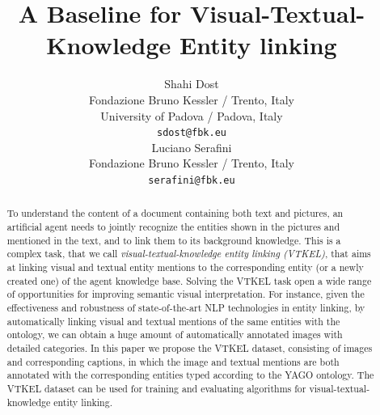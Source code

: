 \documentclass[11pt,a4paper]{article}
\title{A Baseline for Visual-Textual-Knowledge Entity linking}
\author{Shahi Dost \\
  Fondazione Bruno Kessler / Trento, Italy \\
  University of Padova / Padova, Italy \\
  {\tt sdost@fbk.eu} \\\And
  Luciano Serafini \\
  Fondazione Bruno Kessler / Trento, Italy \\
  {\tt serafini@fbk.eu} \\}
\date{}
\begin{document}
\maketitle
\begin{abstract}
  To understand the content of a document containing both text and
pictures, an artificial agent needs to jointly recognize the
entities shown in the pictures and mentioned in the text, and to link
them to its background knowledge.  This is a complex task, that we
call \emph{visual-textual-knowledge entity linking (VTKEL)}, that
aims at linking visual and textual entity mentions to the
corresponding entity (or a newly created one) of the agent knowledge
base.  Solving the VTKEL task open a wide range of
opportunities for improving semantic visual interpretation. For
instance, given the effectiveness and robustness of state-of-the-art
NLP technologies in entity linking, by automatically linking visual and
textual mentions of the same entities with the ontology, we can obtain
a huge amount of automatically annotated images with detailed categories.
In this paper we propose the  VTKEL dataset, consisting of images and corresponding 
captions, in which the image and textual mentions are both annotated with the 
corresponding entities typed according to the YAGO ontology.  The VTKEL
dataset can be used for training and evaluating algorithms for
visual-textual-knowledge entity linking.

  
\end{abstract}
\end{document}
